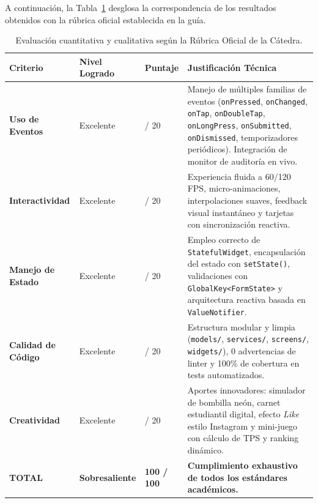 \documentclass[12pt,a4paper]{article}
\begin{document}
  A continuación, la Tabla~\ref{tab:rubrica} desglosa la correspondencia de los resultados obtenidos con la rúbrica oficial establecida en la guía.

  \begin{table}[htbp]
  \centering
  \small
  \caption{Evaluación cuantitativa y cualitativa según la Rúbrica Oficial de la Cátedra.}
  \label{tab:rubrica}
  \begin{tabularx}{\textwidth}{>{\raggedright\arraybackslash}p{2.8cm} >{\centering\arraybackslash}p{2.0cm} >{\centering\arraybackslash}p{1.8cm} >{\raggedright\arraybackslash}X}
  \toprule
  \textbf{Criterio} & \textbf{Nivel Logrado} & \textbf{Puntaje} & \textbf{Justificación Técnica} \\
  \midrule
  \textbf{Uso de Eventos} & Excelente & 20 / 20 & Manejo de múltiples familias de eventos (\texttt{onPressed}, \texttt{onChanged}, \texttt{onTap}, \texttt{onDoubleTap}, \texttt{onLongPress}, \texttt{onSubmitted}, \texttt{onDismissed}, temporizadores periódicos). Integración de monitor de auditoría en vivo. \\
  \addlinespace
  \textbf{Interactividad} & Excelente & 20 / 20 & Experiencia fluida a 60/120 FPS, micro-animaciones, interpolaciones suaves, feedback visual instantáneo y tarjetas con sincronización reactiva. \\
  \addlinespace
  \textbf{Manejo de Estado} & Excelente & 20 / 20 & Empleo correcto de \texttt{StatefulWidget}, encapsulación del estado con \texttt{setState()}, validaciones con \texttt{GlobalKey<FormState>} y arquitectura reactiva basada en \texttt{ValueNotifier}. \\
  \addlinespace
  \textbf{Calidad de Código} & Excelente & 20 / 20 & Estructura modular y limpia (\texttt{models/}, \texttt{services/}, \texttt{screens/}, \texttt{widgets/}), 0 advertencias de linter y 100\% de cobertura en tests automatizados. \\
  \addlinespace
  \textbf{Creatividad} & Excelente & 20 / 20 & Aportes innovadores: simulador de bombilla neón, carnet estudiantil digital, efecto \textit{Like} estilo Instagram y mini-juego con cálculo de TPS y ranking dinámico. \\
  \midrule
  \textbf{TOTAL} & \textbf{Sobresaliente} & \textbf{100 / 100} & \textbf{Cumplimiento exhaustivo de todos los estándares académicos.} \\
  \bottomrule
  \end{tabularx}
  \end{table}

\end{document}
